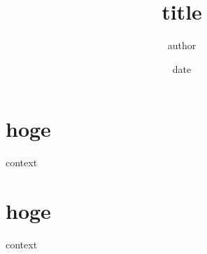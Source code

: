 \documentclass[a4paper,11pt,titlepage]{jsarticle}
\title{title}
\author{author}
\date{date}
\numberwithin{equation}{section}
\begin{document}
   \maketitle

   \section{hoge}
   context

   \section{hoge}
   context
\end{document}
